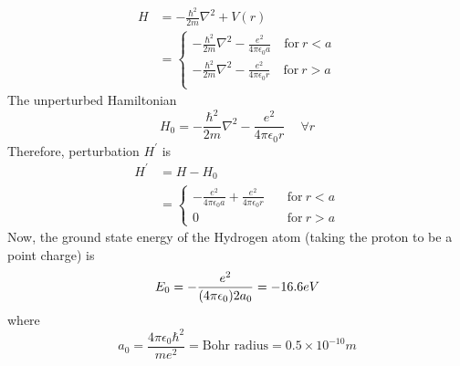 \begin{enumerate}[label=Problem.\arabic*,start=1]
			\begin{align*}
				H &= - \frac{\hbar^2}{2 m} \nabla^2 + V(r) \\
				&= \begin{cases}
					- \frac{\hbar^2}{2 m} \nabla^2 - \frac{e^2}{4 \pi \epsilon_0 a} \quad \text{for} \ r<a \\
					- \frac{\hbar^2}{2 m} \nabla^2 - \frac{e^2}{4 \pi \epsilon_0 r} \quad \text{for} \ r>a \\
				\end{cases}
			\end{align*}
			The unperturbed Hamiltonian
			\begin{equation*}
				H_0 = - \frac{\hbar^2}{2 m} \nabla^2 - \frac{e^2}{4 \pi \epsilon_0 r} \quad \ \forall r
			\end{equation*}
			Therefore, perturbation $H^\prime$ is 
			\begin{align*}
				H^\prime 
				&= H - H_0 \\
				&= \begin{cases}
					- \frac{e^2}{4 \pi \epsilon_0 a} + \frac{e^2}{4 \pi \epsilon_0 r} \quad    &\text{for}\ r < a \\
					0 &\text{for}\ r > a
				\end{cases}
			\end{align*}
			Now, the ground state energy of the Hydrogen atom (taking the proton to be a point charge) is 
			\begin{equation*}
				E_0 = - \frac{e^2}{\qty(4 \pi \epsilon_0) 2 a_0} = - 16.6 eV
			\end{equation*}
			where
			\begin{equation*}
				a_0 = \frac{4\pi \epsilon_0 \hbar^2}{m e^2} = \text{Bohr radius} = 0.5 \times 10^{-10} m
			\end{equation*}
			

\end{enumerate}
